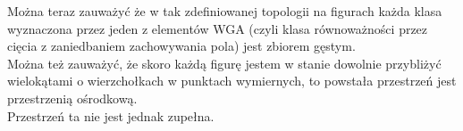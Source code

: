 \documentclass[a4paper, 12pt]{article}
\begin{document}
Można teraz zauważyć że w tak zdefiniowanej topologii na figurach każda klasa wyznaczona przez jeden z
elementów WGA (czyli klasa równoważności przez cięcia z zaniedbaniem zachowywania pola) jest zbiorem gęstym.
\\
Można też zauważyć, że skoro każdą figurę jestem w stanie dowolnie przybliżyć wielokątami o wierzchołkach
w punktach wymiernych, to powstała przestrzeń jest przestrzenią ośrodkową.
\\
Przestrzeń ta nie jest jednak zupełna.
%
%
%
\end{document}
